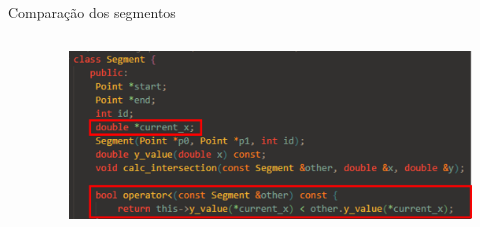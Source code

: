 \documentclass[aspectratio=169,usenames,dvipsnames]{beamer}
\begin{document}
\begin{frame}{Comparação dos segmentos}
  \begin{columns}
      \begin{column}{0.5\textwidth}
      \end{column}
      \begin{column}{0.5\textwidth}
        \begin{figure}
        \includegraphics[width=\textwidth]{figs/segment.png}
        \end{figure}
      \end{column}
  \end{columns}
\end{frame}
\end{document}
